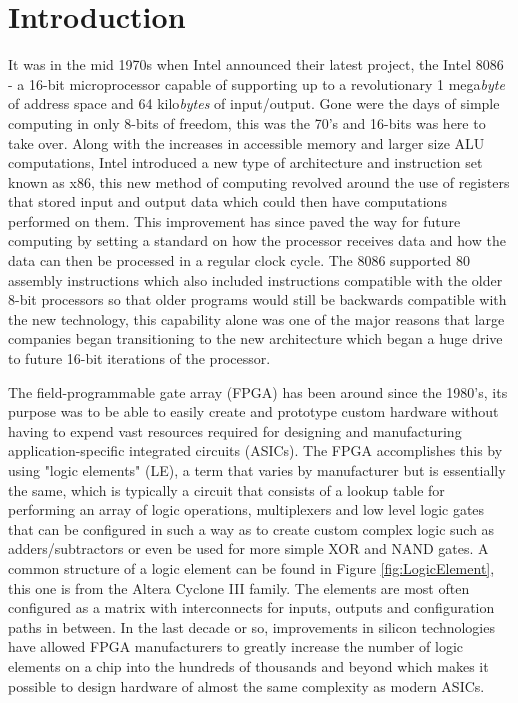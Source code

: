 \documentclass[11pt,peerreview, onecolumn]{IEEEtran}
\begin{document}
\section{Introduction}
It was in the mid 1970s when Intel announced their latest project, the Intel 8086 -  a 16-bit microprocessor capable of supporting up to a revolutionary 1 mega{\em byte} of address space and 64 kilo{\em bytes} of input/output. Gone were the days of simple computing in only 8-bits of freedom, this was the 70's and 16-bits was here to take over. Along with the increases in accessible memory and larger size ALU computations, Intel introduced a new type of architecture and instruction set known as x86, this new method of computing revolved around the use of registers that stored input and output data which could then have computations performed on them. This improvement has since paved the way for future computing by setting a standard on how the processor receives data and how the data can then be processed in a regular clock cycle. The 8086 supported 80 assembly instructions which also included instructions compatible with the older 8-bit processors so that older programs would still be backwards compatible with the new technology, this capability alone was one of the major reasons that large companies began transitioning to the new architecture which began a huge drive to future 16-bit iterations of the processor.

The field-programmable gate array (FPGA) has been around since the 1980's, its purpose was to be able to easily create and prototype custom hardware without having to expend vast resources required for designing and manufacturing application-specific integrated circuits (ASICs). The FPGA accomplishes this by using "logic elements" (LE), a term that varies by manufacturer but is essentially the same, which is typically a circuit that consists of a lookup table for performing an array of logic operations,  multiplexers and low level logic gates that can be configured in such a way as to create custom complex logic such as adders/subtractors or even be used for more simple XOR and NAND gates. A common structure of a logic element can be found in Figure \ref{fig:LogicElement}, this one is from the Altera Cyclone III family. The elements  are most often configured as a matrix with interconnects for inputs, outputs and configuration paths in between. In the last decade or so, improvements in silicon technologies have allowed FPGA manufacturers to greatly increase the number of logic elements on a chip into the hundreds of thousands and beyond which makes it possible to design hardware of almost the same complexity as modern ASICs.
\end{document}
